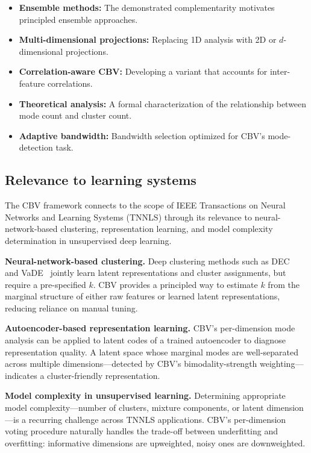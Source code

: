 \documentclass[journal]{IEEEtran}
\begin{document}
\begin{itemize}
    \item \textbf{Ensemble methods:} The demonstrated complementarity motivates principled ensemble approaches.
    \item \textbf{Multi-dimensional projections:} Replacing 1D analysis with 2D or $d$-dimensional projections.
    \item \textbf{Correlation-aware CBV:} Developing a variant that accounts for inter-feature correlations.
    \item \textbf{Theoretical analysis:} A formal characterization of the relationship between mode count and cluster count.
    \item \textbf{Adaptive bandwidth:} Bandwidth selection optimized for CBV's mode-detection task.
\end{itemize}

\subsection{Relevance to learning systems}
\label{sec:relevance}

The CBV framework connects to the scope of IEEE Transactions on Neural Networks and Learning Systems (TNNLS) through its relevance to neural-network-based clustering, representation learning, and model complexity determination in unsupervised deep learning.

\textbf{Neural-network-based clustering.} Deep clustering methods such as DEC~\cite{xie2016deep} and VaDE~\cite{jiang2017vade} jointly learn latent representations and cluster assignments, but require a pre-specified $k$. CBV provides a principled way to estimate $k$ from the marginal structure of either raw features or learned latent representations, reducing reliance on manual tuning.

\textbf{Autoencoder-based representation learning.} CBV's per-dimension mode analysis can be applied to latent codes of a trained autoencoder to diagnose representation quality. A latent space whose marginal modes are well-separated across multiple dimensions---detected by CBV's bimodality-strength weighting---indicates a cluster-friendly representation.

\textbf{Model complexity in unsupervised learning.} Determining appropriate model complexity---number of clusters, mixture components, or latent dimension---is a recurring challenge across TNNLS applications. CBV's per-dimension voting procedure naturally handles the trade-off between underfitting and overfitting: informative dimensions are upweighted, noisy ones are downweighted.
\end{document}
